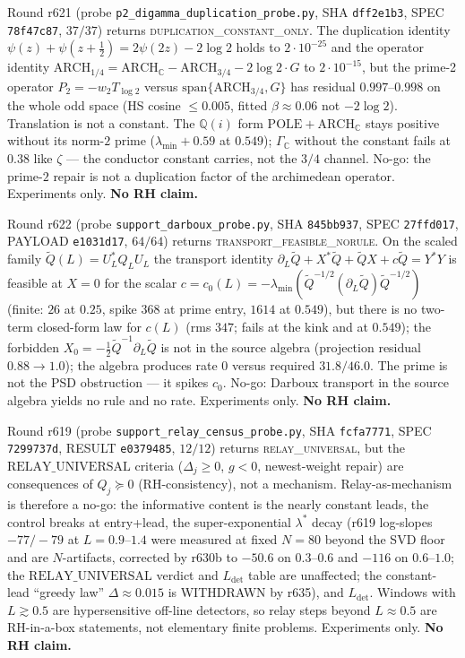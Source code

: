 \documentclass[11pt]{article}
\theoremstyle{definition}
\theoremstyle{remark}
\begin{document}
\noindent Round r621 (probe \texttt{p2\_digamma\_duplication\_probe.py},
SHA \texttt{dff2e1b3}, SPEC \texttt{78f47c87}, $37/37$) returns
\textsc{duplication\_constant\_only}.  The duplication identity
$\psi(z)+\psi(z+\tfrac12)=2\psi(2z)-2\log 2$ holds to
$2\cdot 10^{-25}$ and the operator identity
$\mathrm{ARCH}_{1/4}=\mathrm{ARCH}_{\mathbb C}-\mathrm{ARCH}_{3/4}
-2\log 2\cdot G$ to $2\cdot 10^{-15}$, but the prime-2 operator
$P_2=-w_2 T_{\log 2}$ versus $\mathrm{span}\{\mathrm{ARCH}_{3/4},G\}$
has residual $0.997$--$0.998$ on the whole odd space (HS cosine
$\le 0.005$, fitted $\beta\approx 0.06$ not $-2\log 2$).
Translation is not a constant.  The $\mathbb Q(i)$ form
$\mathrm{POLE}+\mathrm{ARCH}_{\mathbb C}$ stays positive without
its norm-$2$ prime ($\lambda_{\min}+0.59$ at $0.549$);
$\Gamma_{\mathbb C}$ without the constant fails at $0.38$ like
$\zeta$ --- the conductor constant carries, not the $3/4$
channel.  No-go: the prime-$2$ repair is not a duplication
factor of the archimedean operator.  Experiments only.
\textbf{No RH claim.}

\noindent Round r622 (probe \texttt{support\_darboux\_probe.py},
SHA \texttt{845bb937}, SPEC \texttt{27ffd017}, PAYLOAD
\texttt{e1031d17}, $64/64$) returns
\textsc{transport\_feasible\_norule}.  On the scaled family
$\widetilde Q(L)=U_L^*Q_L U_L$ the transport identity
$\partial_L\widetilde Q+X^*\widetilde Q+\widetilde Q X+c\widetilde Q=Y^*Y$
is feasible at $X=0$ for the scalar
$c=c_0(L)=-\lambda_{\min}(\widetilde Q^{-1/2}(\partial_L\widetilde Q)\widetilde Q^{-1/2})$
(finite: $26$ at $0.25$, spike $368$ at prime entry, $1614$ at
$0.549$), but there is no two-term closed-form law for $c(L)$
(rms $347$; fails at the kink and at $0.549$); the forbidden
$X_0=-\tfrac12\widetilde Q^{-1}\partial_L\widetilde Q$ is not in
the source algebra (projection residual $0.88\to 1.0$); the
algebra produces rate $0$ versus required $31.8/46.0$.  The
prime is not the PSD obstruction --- it spikes $c_0$.  No-go:
Darboux transport in the source algebra yields no rule and no
rate.  Experiments only.  \textbf{No RH claim.}

\noindent Round r619 (probe \texttt{support\_relay\_census\_probe.py},
SHA \texttt{fcfa7771}, SPEC \texttt{7299737d}, RESULT
\texttt{e0379485}, $12/12$) returns \textsc{relay\_universal},
but the $\mathrm{RELAY\_UNIVERSAL}$ criteria ($\Delta_j\ge 0$,
$g<0$, newest-weight repair) are consequences of $Q_j\succeq 0$
(RH-consistency), not a mechanism.  Relay-as-mechanism is
therefore a no-go: the informative content is the nearly
constant leads, the control breaks at entry+lead, the
super-exponential $\lambda^*$ decay (r619 log-slopes
$-77/-79$ at $L=0.9$--$1.4$ were measured at fixed $N=80$
beyond the SVD floor and are $N$-artifacts, corrected by
r630b to $-50.6$ on $0.3$--$0.6$ and $-116$ on $0.6$--$1.0$;
the $\mathrm{RELAY\_UNIVERSAL}$ verdict and
$L_{\mathrm{det}}$ table are unaffected; the constant-lead
``greedy law'' $\Delta\approx 0.015$ is WITHDRAWN by r635),
and $L_{\mathrm{det}}$.
Windows with $L\gtrsim 0.5$ are hypersensitive off-line
detectors, so relay steps beyond $L\approx 0.5$ are RH-in-a-box
statements, not elementary finite problems.  Experiments only.
\textbf{No RH claim.}
\end{document}
